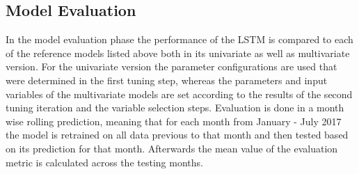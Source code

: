 \subsection{Model Evaluation}
In the model evaluation phase the performance of the LSTM is compared to each of the reference models listed above both in its univariate as well as multivariate version. For the univariate version the parameter configurations are used that were determined in the first tuning step, whereas the parameters and input variables of the multivariate models are set according to the results of the second tuning iteration and the variable selection steps. Evaluation is done in a month wise rolling prediction, meaning that for each month from January - July 2017 the model is retrained on all data previous to that month and then tested based on its prediction for that month. Afterwards the mean value of the evaluation metric is calculated across the testing months.

